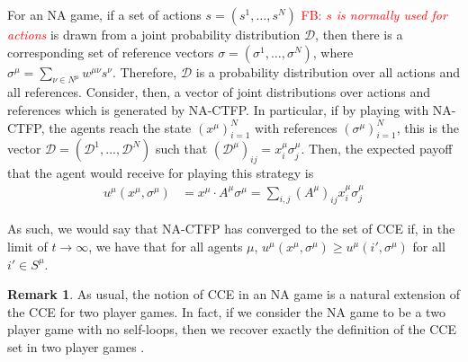 \documentclass{article}
\theoremstyle{definition}
\newtheorem*{remark}{Remark}
\newcommand{\fb}[1]{\textcolor{red}{FB: \textit{#1}}}
\newcommand{\wmunu}{w^{\mu \nu}}
\newcommand{\xmu}{x^{\mu}}
\newcommand{\refmu}{\sigma^{\mu}}
\begin{document}
  For an NA game, if a set of actions $s = (s^1, \ldots, s^N)$ \fb{$s$ is normally used for actions} is
  drawn from a joint probability distribution $\mathcal{D}$, then
  there is a corresponding set of reference vectors $\sigma =
  (\sigma^1, \ldots, \sigma^N)$, where $\sigma^\mu = \sum_{\nu \in
    N^\mu} \wmunu s^\nu$.  Therefore, $\mathcal{D}$ is a probability
  distribution over all actions and all references.  Consider, then, a
  vector of joint distributions over actions and references which is
  generated by NA-CTFP. In particular, if by playing with NA-CTFP, the
  agents reach the state $(\xmu)_{i = 1}^N$ with references
  $(\refmu)_{i = 1}^N$, this is the vector $\mathcal{D} =
  (\mathcal{D}^1, ..., \mathcal{D}^N)$ such that
  $(\mathcal{D}^\mu)_{ij} = \xmu_i \refmu_j$. Then, the expected
  payoff that the agent would receive for playing this strategy is
%
  \begin{align*}
    u^\mu(\xmu, \refmu) & = \xmu \cdot A^\mu \refmu = \sum_{i, j} (A^\mu)_{ij} \xmu_i \refmu_j \nonumber 
  \end{align*}

  As such, we would say that NA-CTFP has converged to the set of CCE if, in the limit of $t
  \rightarrow \infty$, we have that for all agents $\mu$,
  $u^\mu (\xmu, \refmu) \geq u^\mu(i', \refmu)$
  for all $i' \in S^\mu$.

  \begin{remark}
    As usual, the notion of CCE in an NA game is a natural extension of the CCE for two player
    games. In fact, if we consider the NA game to be a two player game with no self-loops, then
    we recover exactly the definition of the CCE set in two player games \cite{Ostrovski2014}.
  \end{remark}
\end{document}
